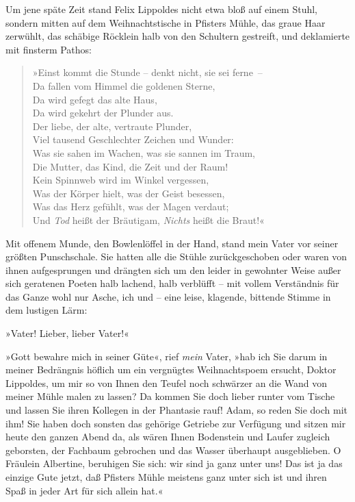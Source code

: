 Um jene späte Zeit stand Felix Lippoldes nicht etwa bloß auf einem
Stuhl, sondern mitten auf dem Weihnachtstische in Pfisters Mühle,
das graue Haar zerwühlt, das schäbige Röcklein halb von den
Schultern gestreift, und deklamierte mit finsterm Pathos:

\begin{verse}
»Einst kommt die Stunde – denkt nicht, sie sei ferne~–\\
Da fallen vom Himmel die goldenen Sterne,\\
Da wird gefegt das alte Haus,\\
Da wird gekehrt der Plunder aus.\\
Der liebe, der alte, vertraute Plunder,\\
Viel tausend Geschlechter Zeichen und Wunder:\\
Was sie sahen im Wachen, was sie sannen im Traum,\\
Die Mutter, das Kind, die Zeit und der Raum!\\
Kein Spinnweb wird im Winkel vergessen,\\
Was der Körper hielt, was der Geist besessen,\\
Was das Herz gefühlt, was der Magen verdaut;\\
Und \emph{Tod} heißt der Bräutigam, \emph{Nichts} heißt die Braut!«
\end{verse}

Mit offenem Munde, den Bowlenlöffel in der Hand, stand mein Vater
vor seiner größten Punschschale. Sie hatten alle die Stühle
zurückgeschoben oder waren von ihnen aufgesprungen und drängten
sich um den leider in gewohnter Weise außer sich geratenen Poeten
halb lachend, halb verblüfft – mit vollem Verständnis für das Ganze
wohl nur Asche, ich und – eine leise, klagende, bittende Stimme in
dem lustigen Lärm:

»Vater! Lieber, lieber Vater!«

»Gott bewahre mich in seiner Güte«, rief \emph{mein} Vater, »hab
ich Sie darum in meiner Bedrängnis höflich um ein vergnügtes
Weihnachtspoem ersucht, Doktor Lippoldes, um mir so von Ihnen den
Teufel noch schwärzer an die Wand von meiner Mühle malen zu lassen?
Da kommen Sie doch lieber runter vom Tische und lassen Sie ihren
Kollegen in der Phantasie rauf! Adam, so reden Sie doch mit ihm!
Sie haben doch sonsten das gehörige Getriebe zur Verfügung und
sitzen mir heute den ganzen Abend da, als wären Ihnen Bodenstein
und Laufer zugleich geborsten, der Fachbaum gebrochen und das
Wasser überhaupt ausgeblieben. O Fräulein Albertine, beruhigen Sie
sich: wir sind ja ganz unter uns! Das ist ja das einzige Gute
jetzt, daß Pfisters Mühle meistens ganz unter sich ist und ihren
Spaß in jeder Art für sich allein hat.«

